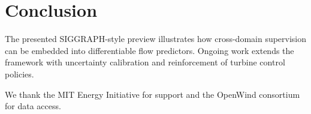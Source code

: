 \documentclass[sigconf]{acmart}
\begin{document}
\section{Conclusion}
The presented SIGGRAPH-style preview illustrates how cross-domain supervision can be embedded into differentiable flow predictors. Ongoing work extends the framework with uncertainty calibration and reinforcement of turbine control policies.

\begin{acks}
We thank the MIT Energy Initiative for support and the OpenWind consortium for data access.
\end{acks}



\end{document}
